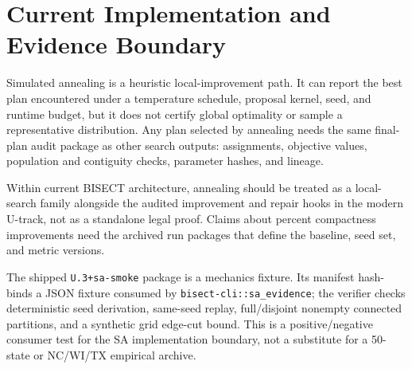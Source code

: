 \section{Current Implementation and Evidence Boundary}

Simulated annealing is a heuristic local-improvement path.  It can report the
best plan encountered under a temperature schedule, proposal kernel, seed, and
runtime budget, but it does not certify global optimality or sample a
representative distribution.  Any plan selected by annealing needs the same
final-plan audit package as other search outputs: assignments, objective values,
population and contiguity checks, parameter hashes, and lineage.

Within current BISECT architecture, annealing should be treated as a local-search
family alongside the audited improvement and repair hooks in the modern U-track,
not as a standalone legal proof.  Claims about percent compactness improvements
need the archived run packages that define the baseline, seed set, and metric
versions.

The shipped \texttt{U.3+sa-smoke} package is a mechanics fixture.  Its manifest
hash-binds a JSON fixture consumed by \texttt{bisect-cli::sa\_evidence}; the
verifier checks deterministic seed derivation, same-seed replay, full/disjoint
nonempty connected partitions, and a synthetic grid edge-cut bound.  This is a
positive/negative consumer test for the SA implementation boundary, not a
substitute for a 50-state or NC/WI/TX empirical archive.
